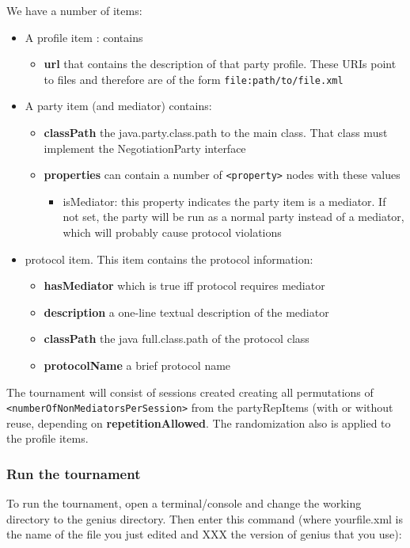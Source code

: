 \documentclass[]{article}
\begin{document}
We have a number of items:
\begin{itemize}

\item A profile item : contains 
	 \begin{itemize}
	\item \textbf{url} that contains the description of that party profile. These URIs point to files and therefore are of the form \verb|file:path/to/file.xml|
  	\end{itemize}

\item A party item  (and mediator) contains:
  \begin{itemize}
    \item \textbf{classPath} the java.party.class.path to the main class. That class must implement the NegotiationParty interface
    \item \textbf{properties} can contain a number of \verb|<property>| nodes with these values
    		\begin{itemize}
		\item isMediator: this property indicates the party item is a mediator. If not set, the party will be 
		run as a normal party instead of a mediator, which will probably cause protocol violations
		\end{itemize}
  \end{itemize}

\item protocol item. This item contains the protocol information: 
	\begin{itemize}
	\item \textbf{hasMediator} which is true iff protocol requires mediator
	\item \textbf{description} a one-line textual description of the mediator
	\item \textbf{classPath} the java full.class.path of the protocol class
	\item \textbf{protocolName} a brief protocol name 
	\end{itemize}
\end{itemize}



The tournament will consist of sessions created creating all permutations of \verb|<numberOfNonMediatorsPerSession>| from the partyRepItems (with or without reuse, depending on \textbf{repetitionAllowed}. The randomization also is applied to the profile items.


\subsubsection{Run the tournament}
To run the tournament, open a terminal/console and change the working directory to the genius directory.
Then enter this command (where yourfile.xml is the name of the file you just edited and XXX the version of genius that you use):
\end{document}
